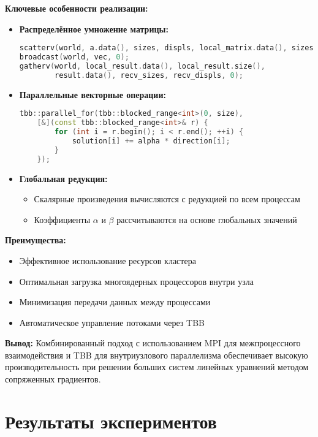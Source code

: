 \documentclass[12pt]{article}
\begin{document}
\textbf{Ключевые особенности реализации:}

\begin{itemize}
    \item \textbf{Распределённое умножение матрицы:}
    \begin{lstlisting}[language=C++]
scatterv(world, a.data(), sizes, displs, local_matrix.data(), sizes[rank], 0);
broadcast(world, vec, 0);
gatherv(world, local_result.data(), local_result.size(), 
        result.data(), recv_sizes, recv_displs, 0);
    \end{lstlisting}

    \item \textbf{Параллельные векторные операции:}
    \begin{lstlisting}[language=C++]
tbb::parallel_for(tbb::blocked_range<int>(0, size),
    [&](const tbb::blocked_range<int>& r) {
        for (int i = r.begin(); i < r.end(); ++i) {
            solution[i] += alpha * direction[i];
        }
    });
    \end{lstlisting}

    \item \textbf{Глобальная редукция:}
    \begin{itemize}
        \item Скалярные произведения вычисляются с редукцией по всем процессам
        \item Коэффициенты $\alpha$ и $\beta$ рассчитываются на основе глобальных значений
    \end{itemize}
\end{itemize}

\textbf{Преимущества:}
\begin{itemize}
    \item Эффективное использование ресурсов кластера
    \item Оптимальная загрузка многоядерных процессоров внутри узла
    \item Минимизация передачи данных между процессами
    \item Автоматическое управление потоками через TBB
\end{itemize}

\textbf{Вывод:} Комбинированный подход с использованием MPI для межпроцессного взаимодействия и TBB для внутриузлового параллелизма обеспечивает высокую производительность при решении больших систем линейных уравнений методом сопряженных градиентов.

\section{Результаты экспериментов}
\end{document}
